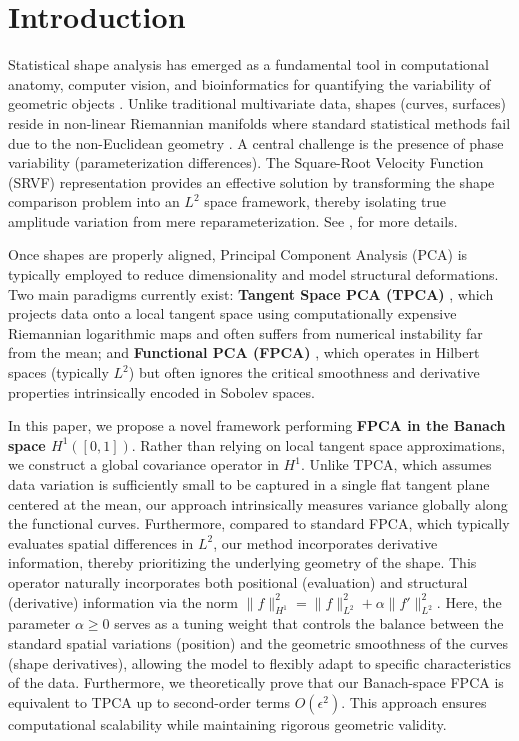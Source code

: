 \documentclass[twoside]{article}
\begin{document}
\section{Introduction}

Statistical shape analysis has emerged as a fundamental tool in computational anatomy, computer vision, and bioinformatics for quantifying the variability of geometric objects \citep{dryden2016statistical}. Unlike traditional multivariate data, shapes (curves, surfaces) reside in non-linear Riemannian manifolds where standard statistical methods fail due to the non-Euclidean geometry \citep{pennec2006intrinsic}. A central challenge is the presence of phase variability (parameterization differences). The Square-Root Velocity Function (SRVF) representation  provides an effective solution by transforming the shape comparison problem into an $L^2$ space framework, thereby isolating true amplitude variation from mere reparameterization.
See \citep{srivastava2011shape, kurtek2012statistical}, for more details.

Once shapes are properly aligned, Principal Component Analysis (PCA) is typically employed to reduce dimensionality and model structural deformations. Two main paradigms currently exist: \textbf{Tangent Space PCA (TPCA)} \citep{fletcher2004principal}, which projects data onto a local tangent space using computationally expensive Riemannian logarithmic maps and often suffers from numerical instability far from the mean; and \textbf{Functional PCA (FPCA)} \citep{ramsay2005functional, happ2018multivariate}, which operates in Hilbert spaces (typically $L^2$) but often ignores the critical smoothness and derivative properties intrinsically encoded in Sobolev spaces.

In this paper, we propose a novel framework performing \textbf{FPCA in the Banach space $H^1([0,1])$}. Rather than relying on local tangent space approximations, we construct a global covariance operator in $H^1$. Unlike TPCA, which assumes data variation is sufficiently small to be captured in a single flat tangent plane centered at the mean, our approach intrinsically measures variance globally along the functional curves. Furthermore, compared to standard FPCA, which typically evaluates spatial differences in $L^2$, our method incorporates derivative information, thereby prioritizing the underlying geometry of the shape. This operator naturally incorporates both positional (evaluation) and structural (derivative) information via the norm $\|f\|_{H^1}^2 = \|f\|_{L^2}^2 + \alpha \|f'\|_{L^2}^2$. Here, the parameter $\alpha \geq 0$ serves as a tuning weight that controls the balance between the standard spatial variations (position) and the geometric smoothness of the curves (shape derivatives), allowing the model to flexibly adapt to specific characteristics of the data. Furthermore, we theoretically prove that our Banach-space FPCA is equivalent to TPCA up to second-order terms $O(\epsilon^2)$. This approach ensures computational scalability while maintaining rigorous geometric validity.
\end{document}
